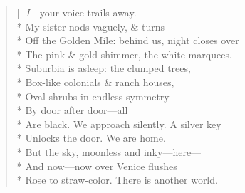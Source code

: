 \begin{verse}[\versewidth]
\textit{I}---your voice trails away.\\*
My sister nods vaguely, \& turns\\*
Off the Golden Mile: behind us, night closes over\\*
The pink \& gold shimmer, the white marquees.\\*
Suburbia is asleep: the clumped trees,\\*
Box-like colonials \& ranch houses,\\*
Oval shrubs in endless symmetry\\*
By door after door---all\\*
Are black. We approach silently. A silver key\\*
Unlocks the door.  We are home.\\*
But the sky, moonless and inky---here---\\*
And now---now over Venice flushes\\*
Rose to straw-color. There is another world.
\end{verse}

